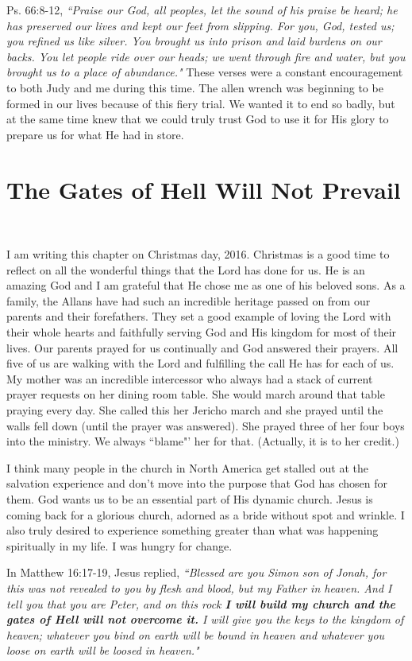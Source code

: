 \documentclass[oneside]{book}
\begin{document}
Ps. 66:8-12, \textit{``Praise our God, all peoples, let the sound of his praise be heard; he has preserved our lives and kept our feet from slipping. For you, God, tested us; you refined us like silver. You brought us into prison and laid burdens on our backs. You let people ride over our heads; we went through fire and water, but you brought us to a place of abundance."} These verses were a constant encouragement to both Judy and me during this time. The allen wrench was beginning to be formed in our lives because of this fiery trial. We wanted it to end so badly, but at the same time knew that we could truly trust God to use it for His glory to prepare us for what He had in store.


\chapter{The Gates of Hell Will Not Prevail}
\

I am writing this chapter on Christmas day, 2016. Christmas is a good time to reflect on all the wonderful things that the Lord has done for us. He is an amazing God and I am grateful that He chose me as one of his beloved sons. As a family, the Allans have had such an incredible heritage passed on from our parents and their forefathers. They set a good example of loving the Lord with their whole hearts and faithfully serving God and His kingdom for most of their lives. Our parents prayed for us continually and God answered their prayers. All five of us are walking with the Lord and fulfilling the call He has for each of us. My mother was an incredible intercessor who always had a stack of current prayer requests on her dining room table. She would march around that table praying every day. She called this her Jericho march and she prayed until the walls fell down (until the prayer was answered). She prayed three of her four boys into the ministry. We always ``blame"' her for that. (Actually, it is to her credit.)

I think many people in the church in North America get stalled out at the salvation experience and don't move into the purpose that God has chosen for them. God wants us to be an essential part of His dynamic church. Jesus is coming back for a glorious church, adorned as a bride without spot and wrinkle. I also truly desired to experience something greater than what was happening spiritually in my life. I was hungry for change.

In Matthew 16:17-19, Jesus replied, \textit{``Blessed are you Simon son of Jonah, for this was not revealed to you by flesh and blood, but my Father in heaven. And I tell you that you are Peter, and on this rock \textbf{I will build my church and the gates of Hell will not overcome it.} I will give you the keys to the kingdom of heaven; whatever you bind on earth will be bound in heaven and whatever you loose on earth will be loosed in heaven."}
\end{document}
